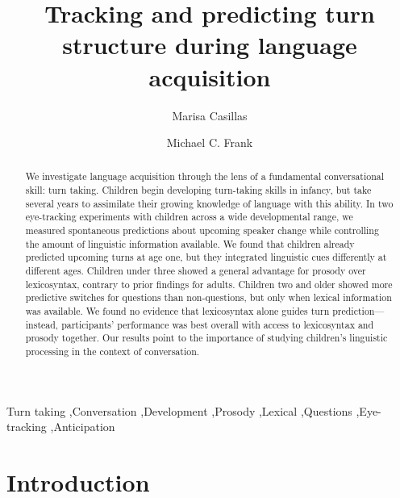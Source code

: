 \documentclass[authoryear, 12pt]{elsarticle}
\begin{document}
\begin{frontmatter}

\title{Tracking and predicting turn structure during language acquisition}

\author[MPI,StanfordLX]{Marisa Casillas}
\address[MPI]{Max Planck Institute for Psycholinguistics, Nijmegen}
\address[StanfordLX]{Department of Linguistics, Stanford University}

\author[StanfordPSY]{Michael C. Frank}

\address[StanfordPSY]{Department of Psychology, Stanford University}

\begin{abstract}
We investigate language acquisition through the lens of a fundamental conversational skill: turn taking. Children begin developing turn-taking skills in infancy, but take several years to assimilate their growing knowledge of language with this ability. In two eye-tracking experiments with children across a wide developmental range, we measured spontaneous predictions about upcoming speaker change while controlling the amount of linguistic information available. We found that children already predicted upcoming turns at age one, but they integrated linguistic cues differently at different ages. Children under three showed a general advantage for prosody over lexicosyntax, contrary to prior findings for adults. Children two and older showed more predictive switches for questions than non-questions, but only when lexical information was available. We found no evidence that lexicosyntax alone guides turn prediction---instead, participants' performance was best overall with access to lexicosyntax and prosody together. Our results point to the importance of studying children's linguistic processing in the context of conversation.
\end{abstract}

\begin{keyword}
Turn taking \sep Conversation \sep Development \sep Prosody \sep Lexical \sep Questions \sep Eye-tracking \sep Anticipation

\end{keyword}

\end{frontmatter}


\section{Introduction}
\label{sec:intro}
\end{document}
